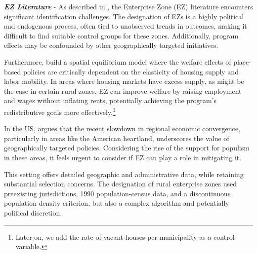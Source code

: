 \textit{\textbf{EZ Literature}} - As described in \cite{Neumark2010}, the Enterprise Zone (EZ) literature encounters significant identification challenges. The designation of EZs is a highly political and endogenous process, often tied to unobserved trends in outcomes, making it difficult to find suitable control groups for these zones. Additionally, program effects may be confounded by other geographically targeted initiatives.

Furthermore, \cite{KlineMoretti2013} build a spatial equilibrium model where the welfare effects of place-based policies are critically dependent  on the elasticity of housing supply and labor mobility. In areas where housing markets have excess supply, as might be the case in certain rural zones, EZ can improve welfare by raising employment and wages without inflating rents, potentially achieving the program's redistributive goals more effectively.\footnote{Later on, we add the rate of vacant houses per municipality as a control variable.}

In the US, \cite{AustinGlaeserSummers2018} argues that the recent slowdown in regional economic convergence, particularly in areas like the American heartland, underscores the value of geographically targeted policies. Considering the rise of the support for populism in these areas, it feels urgent to consider if EZ can play a role in mitigating it.

This setting offers detailed geographic and administrative data, while retaining substantial selection concerns. The designation of rural enterprise zones used preexisting jurisdictions, 1990 population-census data, and a discontinuous population-density criterion, but also a complex algorithm and potentially political discretion.


